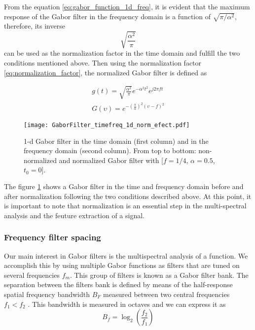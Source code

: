 From the equation \eqref{eq:gabor_function_1d_freq}, it is evident that the maximum response of the Gabor filter in the frequency domain is a function of $\sqrt{\pi/\alpha^2}$, therefore, its inverse
\begin{equation}\label{eq:normalization_factor}
    \sqrt{\frac{\alpha^2}{\pi}}
\end{equation}
can be used as the normalization factor in the time domain and fulfill the two conditions mentioned above. Then using the normalization factor \eqref{eq:normalization_factor}, the normalized Gabor filter is defined as

\begin{equation}\label{eq:gabor_function_1d_timefreq_normalized}
    \begin{gathered}
         g(t) =  \sqrt{\frac{\alpha^2}{\pi}} e ^{-\alpha^2 t^2} e ^{j 2 \pi f t } \\
         G(\upsilon) =  e ^{-\left(\frac{\pi}{\alpha}\right) ^2 (\upsilon-f)^2}
     \end{gathered}
\end{equation}

\begin{figure}[!ht]
\centering
\texttt{[image: GaborFilter\_timefreq\_1d\_norm\_efect.pdf]}
\caption{1-d Gabor filter in the time domain (first column) and in the frequency domain (second  column). From top to bottom: non-normalized and normalized Gabor filter with [$f =1/4$, $\alpha=0.5$, $t_0=0$].}\label{fig:GaborFilter_timefreq_norm_efect}
\end{figure}

The figure \ref{fig:GaborFilter_timefreq_norm_efect} shows a Gabor filter in the time and frequency domain before and after normalization following the two conditions described above. At this point, it is important to note that normalization is an essential step in the multi-spectral analysis and the feuture extraction of a signal.

\subsubsection{Frequency filter spacing}\label{subsec:frequency_filter_spacing}
Our main interest in Gabor filters is the multispectral analysis of a function. We accomplish this by using multiple Gabor functions as filters that are tuned on several frequencies $f_m$. This group of filters is known as a Gabor filter bank. The separation between the filters bank is defined by means of the half-response spatial frequency bandwidth $B_F$ measured between two central frequencies $f_1 < f_2$ \citep{Granlund:CGIP:1978}. This bandwidth is measured in octaves and we can express it as
\begin{equation}\label{eq:octave_spacing}
    B_f = \log_2 \left( \frac{f_2}{f_1} \right)
\end{equation}

